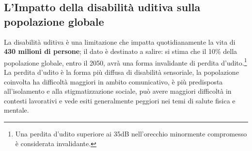 \documentclass[12pt, a4paper]{article}
\begin{document}
    \subsection{L'Impatto della disabilità uditiva sulla popolazione globale}
        La disabilità uditiva è una limitazione che impatta quotidianamente la vita di 
        \textbf{430 milioni di persone}; il dato è destinato a salire: si stima che il 10\% 
        della popolazione globale, entro il 2050, avrà una forma invalidante di perdita 
        d'udito.\cite{who}\footnote{Una perdita d'udito superiore ai 35dB nell'orecchio 
        minormente compromesso è considerata invalidante\cite{who}.}
        La perdita d'udito è la forma più diffusa di disabilità 
        sensoriale\cite{gbd}\cite{gbdwh}, la popolazione coinvolta ha difficoltà maggiori 
        in ambito comunicativo, è più predisposta all'isolamento e alla stigmatizzazione 
        sociale, può avere maggiori difficoltà in contesti lavorativi e 
        vede esiti generalmente peggiori nei temi di salute 
        fisica e mentale.\cite{healthoutcomedeaf}\cite{who}
\end{document}
